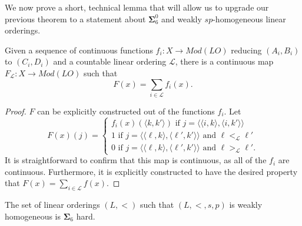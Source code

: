 \documentclass[11pt]{amsart}
\theoremstyle{definition}
\begin{document}
We now prove a short, technical lemma that will allow us to upgrade our previous theorem to a statement about $\mathbf{\Sigma}^0_6$ and weakly $sp$-homogeneous linear orderings.

\begin{lemma}\label{lem:LOsumCont}
Given a sequence of continuous functions $f_i:X\to Mod(LO)$ reducing $(A_i,B_i)$ to $(C_i,D_i)$ and a countable linear ordering $\mathcal{L}$, there is a continuous map $F_\mathcal{L}:X\to Mod(LO)$ such that
\[F(x) = \sum_{i\in\mathcal{L}} f_i(x). \]
\end{lemma}

\begin{proof}
$F$ can be explicitly constructed out of the functions $f_i$.
Let
\[
F(x)(j) = \begin{cases}
f_i(x)(\langle k, k'\rangle ) \text{ if }  j=\langle \langle i,k \rangle,  \langle i,k' \rangle \rangle \\
1 \text{ if } j= \langle \langle \ell,k \rangle,  \langle \ell',k' \rangle \rangle \text{ and } \ell<_{\mathcal{L}} \ell' \\
0 \text{ if } j= \langle \langle \ell,k \rangle,  \langle \ell',k' \rangle \rangle \text{ and } \ell>_{\mathcal{L}} \ell'. 
\end{cases}
\]
It is straightforward to confirm that this map is continuous, as all of the $f_i$ are continuous.
Furthermore, it is explicitly constructed to have the desired property that $F(x) = \sum_{i\in\mathcal{L}} f(x)$.
\end{proof}


\begin{theorem}
The set of linear orderings $(L,<)$ such that $(L,<,s,p)$ is weakly homogeneous is $\mathbf{\Sigma}_6$ hard.
\end{theorem}
\end{document}
